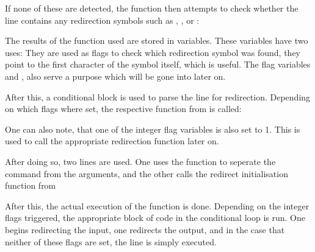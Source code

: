 \documentclass[12pt, a4paper]{report}
\begin{document}
                If none of these are detected, the function then attempts to check
                whether the line contains any redirection symbols such as \tx{>},
                \tx{>>}, \tx{<} or \tx{<<<}:

                \begingroup
                \fontsize{10pt}{10pt}\selectfont
                \endgroup
                The results of the  function used are stored in variables.
                These variables have two uses: They are used as flags to check which
                redirection symbol was found,  they point to the first character
                of the symbol itself, which is useful. The flag variables  and
                , also serve a purpose which will be gone into later on.

                \clearpage

                After this, a conditional  block is used to parse the line
                for redirection. Depending on which  flags where set, the
                respective function from  is called:

                \begingroup
                \fontsize{10pt}{10pt}\selectfont
                \endgroup
                One can also note, that one of the integer flag variables  is
                also set to 1. This is used to call the appropriate redirection function
                later on.

                After doing so, two lines are used. One uses the  function to
                seperate the command from the arguments, and the other calls the 
                redirect initialisation function from 

                \begingroup
                \fontsize{10pt}{10pt}\selectfont
                \endgroup
                After this, the actual execution of the function is done. Depending on 
                the integer flags triggered, the appropriate block of code in the
                conditional loop is run. One begins redirecting the input, one redirects
                the output, and in the case that neither of these flags are set, the
                line is simply executed.

                \begingroup
                \fontsize{10pt}{10pt}\selectfont
                \endgroup
\end{document}
